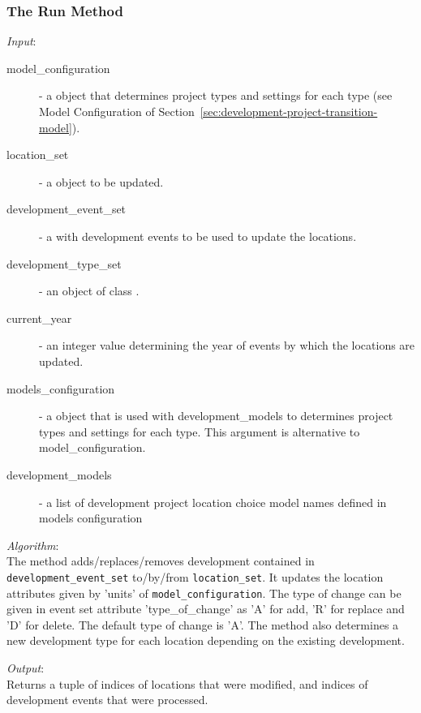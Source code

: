 \subsubsection{The Run Method}
%
{\it Input}:
\begin{description}
\item[model_configuration] - a  object that determines
  project types and settings for each type (see Model Configuration of
  Section~\ref{sec:development-project-transition-model}).
\item[location_set] - a  object to be updated.
\item[development_event_set] - a  with development
  events to be used to update the locations.
\item[development_type_set] - an object of class .
\item[current_year] - an integer value determining the year of events by
  which the locations are updated.
\item[models_configuration] - a  object
  that is used with development_models to determines project
  types and settings for each type.  This argument is
  alternative to model_configuration.
\item[development_models] - a list of development project
  location choice model names defined in models
  configuration
\end{description}

{\it Algorithm}:\\[1mm]
The method adds/replaces/removes development contained in \verb|development_event_set| 
to/by/from \verb|location_set|. It updates the location attributes
given by 'units' of \verb|model_configuration|. The type of change can be given 
in event set attribute 'type_of_change' as 'A' for add, 'R' for replace and 'D' for delete.
The default type of change is 'A'. The method also determines a new development type 
for each location depending on the existing development. 
 

{\it Output}:~\\[1mm]
Returns a tuple of indices of locations that were modified, and indices of
development events that were processed.

